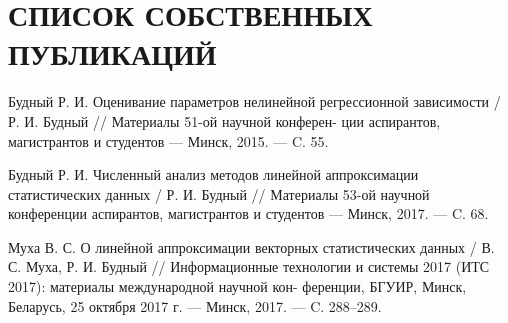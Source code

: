 \chapter*{СПИСОК СОБСТВЕННЫХ ПУБЛИКАЦИЙ}

\noindent [1"---A.] Будный Р. И.
Оценивание параметров нелинейной регрессионной
\hspace*{16.5mm} зависимости / Р. И. Будный // Материалы 51-ой научной конферен-
\hspace*{17mm} ции аспирантов, магистрантов и студентов --- Минск, 2015. --- C. 55.

\noindent [2"---A.] Будный Р. И.
Численный анализ методов линейной аппроксимации
\hspace*{15.5mm} статистических данных / Р. И. Будный // Материалы 53-ой научной
\hspace*{16mm} конференции аспирантов, магистрантов и студентов --- Минск, 2017.
\hspace*{16.5mm} --- C. 68.

\noindent [3"---A.] Муха В. С.
О линейной аппроксимации векторных статистических
\hspace*{15.5mm} данных / В. С. Муха, Р. И. Будный // Информационные технологии
\hspace*{16.5mm} и системы 2017 (ИТС 2017): материалы международной научной кон-
\hspace*{15.5mm} ференции, БГУИР, Минск, Беларусь, 25 октября 2017 г. --- Минск,
\hspace*{16.5mm} 2017. --- C. 288--289.
